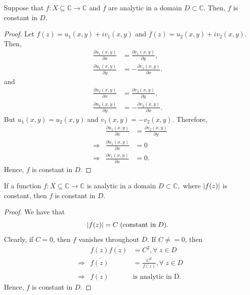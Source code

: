 \documentclass[12pt]{book}
\begin{document}
\begin{thm}
    Suppose that $f: X \subseteq \mathbb{C} \rightarrow \mathbb{C}$ and $\overline{f}$ are analytic in a domain $D \subset \mathbb{C}.$ Then, $f$ is constant in $D.$
\end{thm}
\begin{proof}
    Let $f(z) = u_1(x, y) + iv_1(x, y)$ and $\overline{f}(z) = u_2(x, y) + iv_2(x, y).$  Then,
    \begin{align*}
        \frac{\partial u_1(x, y)}{\partial x} &= \frac{\partial v_1(x, y)}{\partial y}, \\
        \frac{\partial u_1(x, y)}{\partial y} &= -\frac{\partial v_1(x, y)}{\partial x}.
    \end{align*}
    and
    \begin{align*}
        \frac{\partial u_2(x, y)}{\partial x} &= \frac{\partial v_2(x, y)}{\partial y}, \\
        \frac{\partial u_2(x, y)}{\partial y} &= -\frac{\partial v_2(x, y)}{\partial x}.
    \end{align*}
    But $u_1(x, y) = u_2(x, y)$ and $v_1(x, y) = - v_2(x, y).$ Therefore,
    \begin{align*}
        &&\frac{\partial u_1(x, y)}{\partial x} 
            &= 
                \frac{\partial v_2(x, y)}{\partial y} \\
        &\Rightarrow &\frac{\partial u_1(x, y)}{\partial x}
            &=
                0 \\
        &\Rightarrow &\frac{\partial v_1(x, y)}{\partial x}
            &=
                0.
    \end{align*}
    Hence, $f$ is constant in $D$.
\end{proof}

\begin{thm}
    If a function $f: X \subseteq \mathbb{C} \rightarrow \mathbb{C}$ is analytic in a domain $D \subset \mathbb{C},$ where $\left\lvert f(z) \right\rvert$ is constant, then $f$ is constant in $D.$
\end{thm}
\begin{proof}
    We have that
    \[
        \left\lvert f(z) \right\rvert = C\; (\text{constant in}\; D).
    \]
    Clearly, if $C = 0$, then $f$ vanishes throughout $D$. If $C \neq = 0$, then
    \begin{align*}
        &&f(z)\overline{f(z)} 
            &= 
                C^2, \forall\; z \in D \\
        &\Rightarrow &\overline{f(z)} 
            &=
                \frac{C^2}{f(z)}, \forall\; z \in D \\
        &\Rightarrow &\overline{f(z)}\;
            &\text{is analytic in D.}
    \end{align*}
    Hence, $f$ is constant in $D$.
\end{proof}
\end{document}
